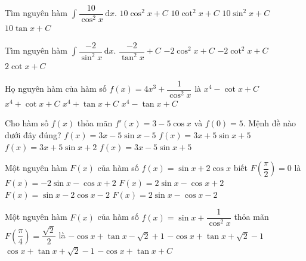 \begin{ex}
	Tìm nguyên hàm $\displaystyle\int \dfrac{10}{\cos^2 x} \mathrm{\,d}x$. 
	\choice
	{ $10\cos^2 x+C$ }
	{ $10\cot^2 x+C$ }
	{ $10\sin^2 x+C$ }
	{ \True $10\tan x+C$ }
	\end{ex}
\begin{ex}
	Tìm nguyên hàm $\displaystyle\int \dfrac{-2}{\sin^2 x} \mathrm{\,d}x$. 
	\choice
	{ $\dfrac{-2}{\tan^2 x}+C$ }
	{ $-2\cos^2 x+C$ }
	{ $-2\cot^2 x+C$ }
	{ \True $2\cot x+C$ }
	\end{ex}
\begin{ex}%
	Họ nguyên hàm của hàm số $f(x)=4x^3+\dfrac{1}{\cos ^2x}$ là
	\choice
	{$x^4-\cot x+C$}
	{$x^4+\cot x+C$}
	{\True $x^4+\tan x+C$}
	{$x^4-\tan x+C$}
\end{ex}
\begin{ex}
	Cho hàm số $f(x)$ thỏa mãn $f'(x) = 3 - 5\cos x$ và $f(0) = 5$. Mệnh đề nào dưới đây đúng?
	\choice
	{$f(x) = 3x - 5\sin x - 5$}
	{$f(x) = 3x + 5\sin x + 5$}
	{$f(x) = 3x + 5\sin x + 2$}
	{\True $f(x) = 3x -5\sin x + 5$}
\end{ex}

\begin{ex}
	Một nguyên hàm $F(x)$ của hàm số $f(x)=\sin x+2\cos x$ biết $F\left( \dfrac{\pi}{2}\right)=0$ là
	\choice
	{$F(x)=-2\sin x-\cos x+2  $}
	{ $F(x)=2\sin x-\cos x+2 $}
	{ $F(x)=\sin x-2\cos x-2  $}
	{\True $F(x)=2\sin x-\cos x-2  $}
\end{ex}

\begin{ex}
	Một nguyên hàm $F(x)$ của hàm số $f(x)=\sin x+\dfrac{1}{\cos^2 x}$ thỏa mãn $F\left(\dfrac{\pi}{4}\right)=\dfrac{\sqrt2}{2}$ là
	\choice
	{$-\cos x+\tan x-\sqrt2 +1$}
	{\True $-\cos x+\tan x+\sqrt2 -1$}
	{$\cos x+\tan x+\sqrt2 -1$}
	{ $-\cos x+\tan x+C$}
\end{ex}

